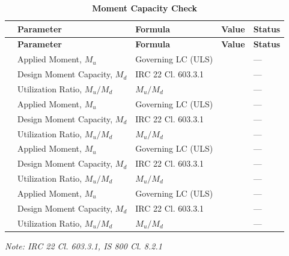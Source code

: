 \documentclass[12pt,a4paper]{report}
\numberwithin{table}{chapter}
\numberwithin{figure}{chapter}
\begin{document}
\vspace{1em}
\begin{longtable}{|C{2.5cm}|C{3.5cm}|C{3.5cm}|>{\centering\arraybackslash}p{4.2cm}|C{1.8cm}|}
\caption{\textbf{Moment Capacity Check}}
\hline
{} \textbf{} & \textbf{Parameter} & \textbf{Formula} & \textbf{Value} & \textbf{Status} \\[6pt]
\hline
\endfirsthead
\hline
{} \textbf{} & \textbf{Parameter} & \textbf{Formula} & \textbf{Value} & \textbf{Status} \\[6pt]
\hline
\endhead
{} & Applied Moment, $M_u$ & Governing LC (ULS) &  & --- \\[6pt]
 & Design Moment Capacity, $M_d$ & IRC 22 Cl. 603.3.1 &  & --- \\[6pt]
 & Utilization Ratio, $M_u / M_d$ & $M_u / M_d$ &  & --- \\[6pt]
\hline
{} & Applied Moment, $M_u$ & Governing LC (ULS) &  & --- \\[6pt]
 & Design Moment Capacity, $M_d$ & IRC 22 Cl. 603.3.1 &  & --- \\[6pt]
 & Utilization Ratio, $M_u / M_d$ & $M_u / M_d$ &  & --- \\[6pt]
\hline
{} & Applied Moment, $M_u$ & Governing LC (ULS) &  & --- \\[6pt]
 & Design Moment Capacity, $M_d$ & IRC 22 Cl. 603.3.1 &  & --- \\[6pt]
 & Utilization Ratio, $M_u / M_d$ & $M_u / M_d$ &  & --- \\[6pt]
\hline
{} & Applied Moment, $M_u$ & Governing LC (ULS) &  & --- \\[6pt]
 & Design Moment Capacity, $M_d$ & IRC 22 Cl. 603.3.1 &  & --- \\[6pt]
 & Utilization Ratio, $M_u / M_d$ & $M_u / M_d$ &  & --- \\[6pt]
\hline
\end{longtable}
\noindent\textit{Note: IRC 22 Cl. 603.3.1, IS 800 Cl. 8.2.1}
\end{document}
